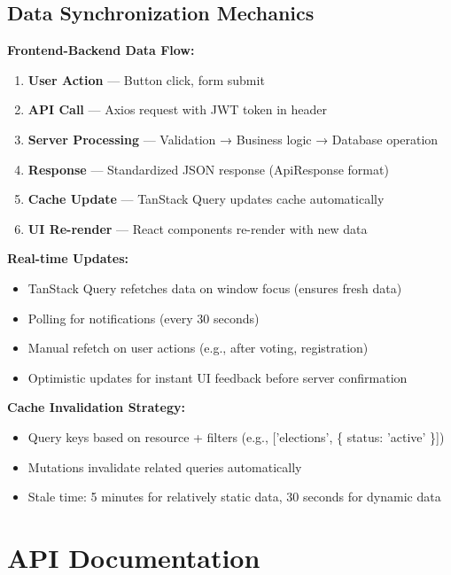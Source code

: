 \documentclass[12pt,a4paper]{article}
\begin{document}
\subsection{Data Synchronization Mechanics}

\textbf{Frontend-Backend Data Flow:}
\begin{enumerate}[noitemsep]
  \item \textbf{User Action} — Button click, form submit
  \item \textbf{API Call} — Axios request with JWT token in header
  \item \textbf{Server Processing} — Validation → Business logic → Database operation
  \item \textbf{Response} — Standardized JSON response (ApiResponse format)
  \item \textbf{Cache Update} — TanStack Query updates cache automatically
  \item \textbf{UI Re-render} — React components re-render with new data
\end{enumerate}

\textbf{Real-time Updates:}
\begin{itemize}[noitemsep]
  \item TanStack Query refetches data on window focus (ensures fresh data)
  \item Polling for notifications (every 30 seconds)
  \item Manual refetch on user actions (e.g., after voting, registration)
  \item Optimistic updates for instant UI feedback before server confirmation
\end{itemize}

\textbf{Cache Invalidation Strategy:}
\begin{itemize}[noitemsep]
  \item Query keys based on resource + filters (e.g., ['elections', \{ status: 'active' \}])
  \item Mutations invalidate related queries automatically
  \item Stale time: 5 minutes for relatively static data, 30 seconds for dynamic data
\end{itemize}
\clearpage
\section{API Documentation}
\label{sec:api}
\end{document}
